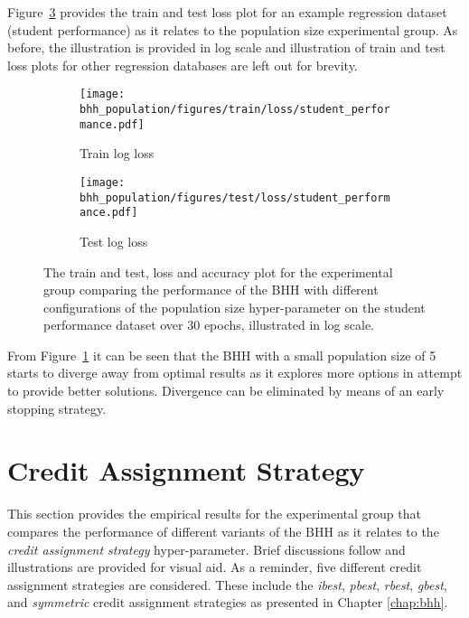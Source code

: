 Figure~\ref{fig:results:population:figures:student_performance} provides the train and test loss plot for an example regression dataset (student performance) as it relates to the population size experimental group. As before, the illustration is provided in log scale and illustration of train and test loss plots for other regression databases are left out for brevity.

\begin{figure}[H]
	\begin{subfigure}{0.5\textwidth}
		\centering
		\texttt{[image: bhh\_population/figures/train/loss/student\_performance.pdf]}
		\caption{Train log loss}
		\label{fig:results:population:figures:loss:train:student_performance}
	\end{subfigure}
	\begin{subfigure}{0.5\textwidth}
		\centering
		\texttt{[image: bhh\_population/figures/test/loss/student\_performance.pdf]}
		\caption{Test log loss}
		\label{fig:results:population:figures:loss:test:student_performance}
	\end{subfigure}
	\par\bigskip
	\caption{The train and test, loss and accuracy plot for the experimental group comparing the performance of the \acs{BHH} with different configurations of the population size hyper-parameter on the student performance dataset over 30 epochs, illustrated in log scale.}
	\label{fig:results:population:figures:student_performance}
\end{figure}

From Figure~\ref{fig:results:population:figures:loss:train:student_performance} it can be seen that the \acs{BHH} with a small population size of 5 starts to diverge away from optimal results as it explores more options in attempt to provide better solutions. Divergence can be eliminated by means of an early stopping strategy.

\section{Credit Assignment Strategy}\label{sec:results:credit}

This section provides the empirical results for the experimental group that compares the performance of different variants of the \acs{BHH} as it relates to the \textit{credit assignment strategy} hyper-parameter. Brief discussions follow and illustrations are provided for visual aid. As a reminder, five different credit assignment strategies are considered. These include the \textit{ibest}, \textit{pbest}, \textit{rbest}, \textit{gbest}, and \textit{symmetric} credit assignment strategies as presented in Chapter \ref{chap:bhh}.

